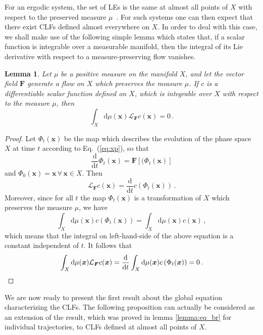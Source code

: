 \documentclass{article}
\theoremstyle{plain}
\newtheorem{lemma}[theorem]{Lemma}
\theoremstyle{definition}
\theoremstyle{remark}
\newcommand{\vect}[1]{\boldsymbol{#1}}
\providecommand{\detail}[1]{#1}
\renewcommand{\detail}[1]{}
\begin{document}
For an ergodic system, the set of LEs is the same at almost all points
of $X$ with respect to the preserved measure
$\mu$~\cite{ruelle1979}. \detail{page 282, 2.1} For such systems one
can then expect that there exist CLFs defined almost everywhere on
$X$. In order to deal with this case, we shall make use of the 
following simple lemma
which states that, if a scalar function is integrable over a 
measurable manifold, then the integral of its Lie derivative with respect
to a measure-preserving flow vanishes.

\begin{lemma}\label{lemma:lie}
Let $\mu$ be a positive measure on the manifold $X$, and
let the vector field $\vect{F}$ generate a flow on 
$X$ which preserves the measure $\mu$.
If $c$ is a differentiable scalar function defined on $X$,
which is integrable over $X$ with respect to the measure $\mu$,
then 
\[
\int_X \mathrm{d}\mu(\vect{x}) \mathcal{L}_{\vect{F}}c(\vect{x})=0\,.
\]
\end{lemma}
\begin{proof}
Let $\Phi_t(\vect{x})$ be the map which describes the evolution
of the phase space $X$ at time $t$
according to Eq.~(\ref{eq:xp}), so that
\[
\frac{\mathrm{d}}{\mathrm{d}t}\Phi_t(\vect{x})=\vect{F}
\left[(\Phi_t(\vect{x})\right] 
\]
and $\Phi_0(\vect x)=\vect x\,\forall\,\vect x\in X$. Then
\[
\mathcal{L}_{\vect{F}}c(\vect{x})=\frac{\mathrm{d}}{\mathrm{d}t}
c\left(\Phi_t(\vect {x})\right)\,.
\]
Moreover,
since for all $t$ the map $\Phi_t(\vect{x})$ is a transformation of $X$ 
which preserves the measure $\mu$, we have
\[
\int_X \mathrm{d}\mu(\vect{x})c\left(\Phi_t(\vect {x})\right) 
=\int_X \mathrm{d}\mu(\vect{x})c\left(\vect {x}\right) \,, 
\]
which means that the integral on
left-hand-side of the above equation is a constant
independent of $t$. It follows that
\[
\int_X \mathrm{d}\mu(\vect{x}) \mathcal{L}_{\vect{F}}c(\vect{x})
=\frac{\mathrm{d}}{\mathrm{d}t}
\int_X \mathrm{d}\mu(\vect{x})c\left(\Phi_t(\vect {x})\right) =0\,.
\qedhere
\]
\end{proof}

We are now ready to present the first result about the global equation
characterizing the CLFs.
The following proposition can actually be considered as an extension of the
result, which was proved in lemma \ref{lemma:eq_br} for individual
trajectories, to CLFs defined at almost all points of $X$.
\end{document}
